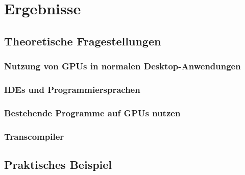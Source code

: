 
\section{Ergebnisse}
\label{sec:Ergebnisse}

\subsection{Theoretische Fragestellungen}
\subsubsection{Nutzung von GPUs in normalen Desktop-Anwendungen}
\subsubsection{IDEs und Programmiersprachen}
\subsubsection{Bestehende Programme auf GPUs nutzen}
\subsubsection{Transcompiler}

\newpage
\subsection{Praktisches Beispiel}
